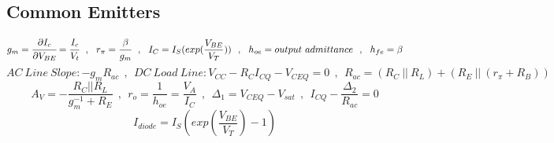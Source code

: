 \subsection{Common Emitters}
\vspace{0.5em}
$$ g_m = \cfrac{\partial I_c}{\partial V_{BE}} = \cfrac{I_c}{V_t} ~~,~~ r_\pi = \cfrac{\beta}{g_m} ~~ , ~~ I_C = I_S ( exp (\dfrac{V_{BE}}{V_T}))~~ , ~~ h_{oe} = output~admittance ~~ , ~~ h_{fe} = \beta $$\vspace{0em}
$$AC~Line~Slope:  -g_m R_{ac}  ~~ , ~~ DC~Load~Line :  V_{CC} - R_C I_{CQ} - V_{CEQ} = 0 ~~ , ~~ R_{ac} = ( R_C ~ || ~ R_L ) + ( R_E~ || ~ ( r_{\pi} + R_B ) ) $$\vspace{0em}
$$ A_V = -\dfrac{R_C || R_L}{g_m^{-1} + R_E} ~~ , ~~ r_o = \frac{1}{h_{oe}} = \frac{V_A}{I_C} ~~ , ~~ {\Delta}_1 = V_{CEQ} - V_{sat} ~~ , ~~ I_{CQ} - \frac{{\Delta}_2}{R_{ac}} = 0 $$\vspace{0em}
$$ I_{diode} = I_S ( exp (\dfrac{V_{BE}}{V_T}) - 1) $$

